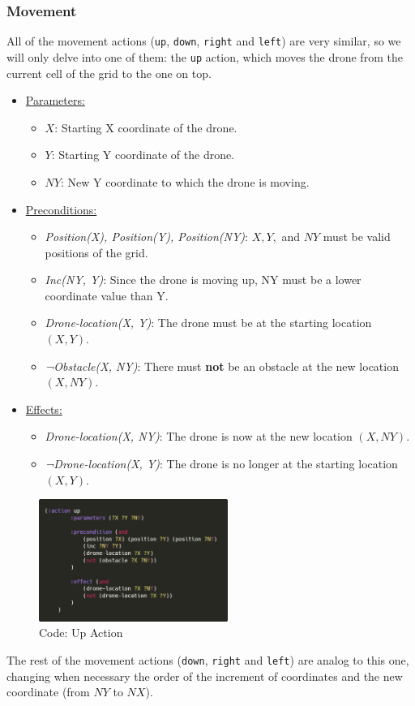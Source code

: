 \documentclass{article}
\begin{document}
\subsubsection{Movement}
All of the movement actions (\texttt{up}, \texttt{down}, \texttt{right} and \texttt{left}) are very similar, so we will only delve into one of them: the \texttt{up} action, which moves the drone from the current cell of the grid to the one on top.
\begin{itemize}
    \item \underline{Parameters:}
    \begin{itemize}
        \item $X$: Starting X coordinate of the drone.
        \item $Y$: Starting Y coordinate of the drone.
        \item $NY$: New Y coordinate to which the drone is moving.
    \end{itemize}
    \item \underline{Preconditions:}
    \begin{itemize}
        \item \textit{Position(X), Position(Y), Position(NY)}: $X, Y,$ and $NY$ must be valid positions of the grid.
        \item \textit{Inc(NY, Y)}: Since the drone is moving up, NY must be a lower coordinate value than Y.
        \item \textit{Drone-location(X, Y)}: The drone must be at the starting location $(X, Y)$.
        \item \textit{¬Obstacle(X, NY)}: There must \textbf{not} be an obstacle at the new location $(X, NY)$.
    \end{itemize}
    \item \underline{Effects:}
    \begin{itemize}
        \item \textit{Drone-location(X, NY)}: The drone is now at the new location $(X, NY)$.
        \item \textit{¬Drone-location(X, Y)}: The drone is no longer at the starting location $(X, Y)$.
    \end{itemize}
\end{itemize}
\begin{figure}[ht]
    \centering
    \includegraphics[width=0.55\textwidth]{assets/solution_coordinates/up.png}
    \caption{Code: Up Action}
    \label{fig:act:up}
\end{figure}
The rest of the movement actions (\texttt{down}, \texttt{right} and \texttt{left}) are analog to this one, changing when necessary the order of the increment of coordinates and the new coordinate (from $NY$ to $NX$).
\end{document}
